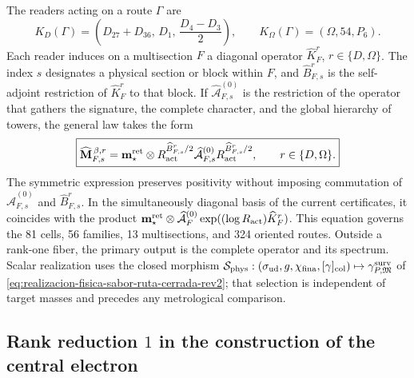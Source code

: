 The readers acting on a route \(\Gamma\) are
\begin{equation}
 K_D(\Gamma)
 =\left(D_{27}+D_{36},\,D_1,\,\frac{D_4-D_3}{2}\right),
 \qquad
 K_\Omega(\Gamma)=(\Omega,54,P_6).
 \label{eq:lectores-kd-komega-masas-rectoras}
\end{equation}
Each reader induces on a multisection \(F\) a diagonal operator \(\widehat K_F^r\), \(r\in\{D,\Omega\}\). The index \(s\) designates a physical section or block within \(F\), and \(\widehat B_{F,s}^r\) is the self-adjoint restriction of \(\widehat K_F^r\) to that block. If \(\widehat{\mathcal A}^{(0)}_{F,s}\) is the restriction of the operator that gathers the signature, the complete character, and the global hierarchy of towers, the general law takes the form
\begin{equation}
 \boxed{
 \widehat{\mathbf M}^{\,\beta,r}_{F,s}
 =\mathbf m_\star^{\rm ret}\otimes
  R_{\rm act}^{\widehat B_{F,s}^r/2}
  \widehat{\mathcal A}^{(0)}_{F,s}
  R_{\rm act}^{\widehat B_{F,s}^r/2},
 \qquad r\in\{D,\Omega\}.}
 \label{eq:ley-operatorial-general-masas-rectoras}
\end{equation}
The symmetric expression preserves positivity without imposing commutation of
\(\widehat{\mathcal A}^{(0)}_{F,s}\) and \(\widehat B_{F,s}^r\). In the simultaneously
diagonal basis of the current certificates, it coincides with the product
\(\mathbf m_\star^{\rm ret}\otimes\widehat{\mathcal A}^{(0)}_F
\exp((\log R_{\rm act})\widehat K_F^r)\).
This equation governs the 81 cells, 56 families, 13 multisections, and
324 oriented routes. Outside a rank-one fiber, the primary output is the
complete operator and its spectrum. Scalar realization uses the closed morphism
\(\mathcal S_{\rm phys}:(\sigma_{\rm ud},g,\chi_{\rm fina},[\gamma]_{\rm col})
\mapsto\gamma^{\rm surv}_{P,\mathfrak M}\) of
\cref{eq:realizacion-fisica-sabor-ruta-cerrada-rev2}; that selection is
independent of target masses and precedes any metrological comparison.

\subsection{Rank reduction \(1\) in the construction of the central electron}

